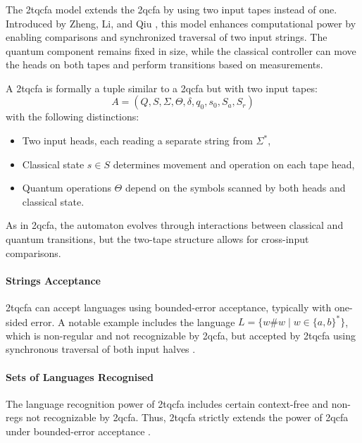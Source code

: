 \subsubsection{}

  
The \gls{2tqcfa} model extends the \gls{2qcfa} by using two input tapes instead of one. Introduced by Zheng, Li, and Qiu \cite{zheng2011two}, this model enhances computational power by enabling comparisons and synchronized traversal of two input strings. The quantum component remains fixed in size, while the classical controller can move the heads on both tapes and perform transitions based on measurements.

\begin{definition}
A \gls{2tqcfa} is formally a tuple similar to a \gls{2qcfa} but with two input tapes:
\[
A = (Q, S, \Sigma, \Theta, \delta, q_0, s_0, S_a, S_r)
\]
with the following distinctions:
\begin{itemize}
    \item Two input heads, each reading a separate string from $\Sigma^*$,
    \item Classical state $s \in S$ determines movement and operation on each tape head,
    \item Quantum operations $\Theta$ depend on the symbols scanned by both heads and classical state.
\end{itemize}
\end{definition}

As in \gls{2qcfa}, the automaton evolves through interactions between classical and quantum transitions, but the two-tape structure allows for cross-input comparisons.

\paragraph{Strings Acceptance}  
\gls{2tqcfa} can accept languages using bounded-error acceptance, typically with one-sided error. A notable example includes the language $L = \{ w \# w \mid w \in \{a, b\}^* \}$, which is non-regular and not recognizable by \gls{2qcfa}, but accepted by \gls{2tqcfa} using synchronous traversal of both input halves \cite{zheng2011two}.

\paragraph{Sets of Languages Recognised}  
The language recognition power of \gls{2tqcfa} includes certain context-free and non-\glspl{reg} not recognizable by \gls{2qcfa}. Thus, \gls{2tqcfa} strictly extends the power of \gls{2qcfa} under bounded-error acceptance \cite{zheng2011two}.

